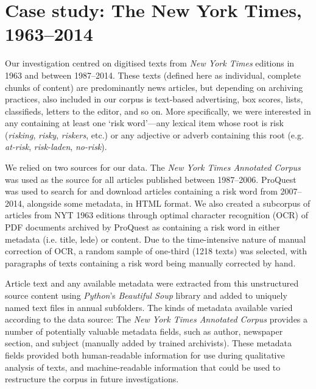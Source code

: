 
\chapter{Case study: The New York Times, 1963--2014}

    Our investigation centred on digitised texts from \emph{New York Times} editions in 1963 and between 1987--2014. These texts (defined here as individual, complete chunks of content) are predominantly news articles, but depending on archiving practices, also included in our corpus is text-based advertising, box scores, lists, classifieds, letters to the editor, and so on. More specifically, we were interested in any  containing at least one `risk word'---any lexical item whose root is risk (\emph{risking}, \emph{risky}, \emph{riskers}, etc.) or any adjective or adverb containing this root (e.g. \emph{at-risk}, \emph{risk-laden}, \emph{no-risk}).~

    We relied on two sources for our data. The \emph{New York Times Annotated Corpus} \cite{sandhaus_new_2008} was used as the source for all articles published between 1987--2006. ProQuest was used to search for and download articles containing a risk word from 2007--2014, alongside some metadata, in HTML format. We also created a subcorpus of articles from NYT 1963 editions through optimal character recognition (OCR) of PDF documents archived by ProQuest as containing a risk word in either metadata (i.e. title, lede) or content. Due to the time-intensive nature of manual correction of OCR, a random sample of one-third (1218 texts) was selected, with paragraphs of texts containing a risk word being manually corrected by hand.

    Article text and any available metadata were extracted from this unstructured source content using \emph{Python}'s \emph{Beautiful Soup} library and added to uniquely named text files in annual subfolders. The kinds of metadata available varied according to the data source: The \emph{New York Times Annotated Corpus} provides a number of potentially valuable metadata fields, such as author, newspaper section, and subject (manually added by trained archivists). These metadata fields provided both human-readable information for use during qualitative analysis of texts, and machine-readable information that could be used to restructure the corpus in future investigations.

